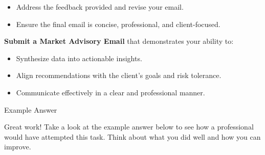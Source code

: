 \documentclass[11pt]{article}
\begin{document}
\begin{itemize}[leftmargin=1.5em, itemsep=2pt]
  \item Address the feedback provided and revise your email.
  \item Ensure the final email is concise, professional, and client-focused.
\end{itemize}

\textbf{Submit a Market Advisory Email} that demonstrates your ability to:
\begin{itemize}[leftmargin=1.5em, itemsep=2pt]
  \item Synthesize data into actionable insights.
  \item Align recommendations with the client's goals and risk tolerance.
  \item Communicate effectively in a clear and professional manner.
\end{itemize}


\newpage
{\fontsize{26}{30}\selectfont Example Answer}\par\bigskip

Great work! Take a look at the example answer below to see how a professional
would have attempted this task. Think about what you did well and how you can
improve.
\end{document}
